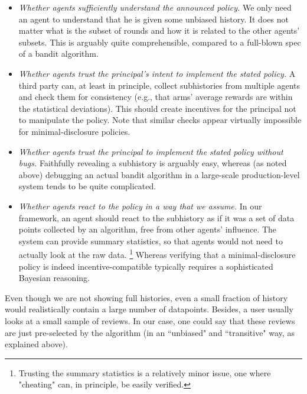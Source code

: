 \begin{itemize}

\item \emph{Whether agents sufficiently understand the announced policy.} We only need an agent to understand that he is given some unbiased history. It does not matter what is the subset of rounds and how it is related to the other agents' subsets. This is arguably quite comprehensible, compared to a full-blown spec of a bandit algorithm.

\item \emph{Whether agents trust the principal's intent to implement the stated policy.} A third party can, at least in principle, collect subhistories from multiple agents and check them for consistency (e.g., that arms' average rewards are within the statistical deviations). This should create incentives for the principal not to manipulate the policy. Note that similar checks appear virtually impossible for minimal-disclosure policies.


\item \emph{Whether agents trust the principal to implement the stated policy without bugs.}
    Faithfully revealing a subhistory is arguably easy, whereas (as noted above) debugging an actual bandit algorithm in a large-scale production-level system tends to be quite complicated.

\item \emph{Whether agents react to the policy in a way that we assume.}
In our framework, an agent should react to the subhistory as if it was a set of data points collected by an algorithm, free from other agents' influence. The system can provide summary statistics, so that agents would not need to actually look at the raw data.%
\footnote{Trusting the summary statistics is a relatively minor issue, one where "cheating" can, in principle, be easily verified.}
Whereas verifying that a minimal-disclosure policy is indeed incentive-compatible typically requires a sophisticated Bayesian reasoning.

\end{itemize}

Even though we are not showing full histories, even a small fraction of history would realistically contain a large number of datapoints. Besides, a user usually looks at a small sample of reviews. In our case, one could say that these reviews are just pre-selected by the algorithm (in an ``unbiased" and ``transitive" way, as explained above).


